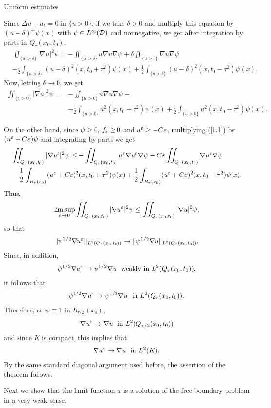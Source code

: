 \begin{section}{Uniform estimates}
\begin{pf}
Since $\Delta u - u_t = 0$ in $\{ u>0 \}$, if we take $\delta>0$ and multiply 
this equation by $(u-\delta)^+ \psi(x)$ with $\psi\in L^{\infty}({\cal D})$ 
and nonnegative, we get after integration by parts in $Q_{\tau}(x_0,t_0)$, 
\begin{align*}
&\iint_{\{ u>\delta\}}|\nabla u|^2 \psi =
-\iint_{\{ u>\delta\}}u\nabla u\nabla \psi +
\delta\iint_{\{ u>\delta\}}\nabla u\nabla\psi \\
&- \frac12 \int_{\{ u>\delta\}} (u-\delta)^2(x,t_0+\tau^2)\psi(x)
+ \frac12 \int_{\{ u>\delta\}} (u-\delta)^2(x,t_0-\tau^2)\psi(x).
\end{align*}
Now, letting $\delta\to 0$, we get
\begin{align*}
\iint_{\{ u>0\}}|\nabla u|^2\psi=&
-\iint_{\{ u>0\}} u\nabla u\nabla\psi -\\
&-\frac12\int_{\{ u>0\}} u^2(x,t_0+\tau^2)\psi(x)
+ \frac12\int_{\{ u>0\}} u^2(x,t_0-\tau^2)\psi(x).
\end{align*}

On the other hand, since $\psi\ge0$, $f_{\varepsilon}\ge0$ and $u^{\varepsilon}\ge-C\varepsilon$, 
multiplying (\ref{1.1}) by $(u^{\varepsilon}+C\varepsilon)\psi$ and integrating by parts 
we get
\begin{align*}
&\iint_{Q_{\tau}(x_0,t_0)}|\nabla u^{\varepsilon}|^2\psi\le
-\iint_{Q_{\tau}(x_0,t_0)} u^{\varepsilon}\nabla u^{\varepsilon}\nabla\psi -
C\varepsilon\iint_{Q_{\tau}(x_0,t_0)} \nabla u^{\varepsilon}\nabla\psi \\
&- \frac12\int_{B_{\tau}(x_0)} (u^{\varepsilon}+C\varepsilon)^2(x,t_0+\tau^2)\psi(x) +
\frac12\int_{B_{\tau}(x_0)} (u^{\varepsilon}+C\varepsilon)^2(x,t_0-\tau^2)\psi(x).
\end{align*}
Thus, 
$$\limsup_{\varepsilon\to0}\iint_{Q_{\tau}(x_0,t_0)}|\nabla u^{\varepsilon}|^2\psi\le
\iint_{Q_{\tau}(x_0,t_0)}|\nabla u|^2\psi,$$
so that
$$\|\psi^{1/2}\nabla u^{\varepsilon}\|_{L^2(Q_{\tau}(x_0,t_0))}\to
\|\psi^{1/2}\nabla u\|_{L^2(Q_{\tau}(x_0,t_0))}.$$
Since, in addition, 
$$\psi^{1/2}\nabla u^{\varepsilon}\to\psi^{1/2}\nabla u
\ \mbox{ weakly in } L^2(Q_{\tau}(x_0,t_0)),$$
it follows that
$$\psi^{1/2}\nabla u^{\varepsilon}\to\psi^{1/2}\nabla u
\ \mbox{ in } L^2(Q_{\tau}(x_0,t_0)).$$
Therefore, as $\psi\equiv 1$ in $B_{\tau/2}(x_0)$, 
$$\nabla u^{\varepsilon}\to\nabla u\ \mbox{ in } L^2(Q_{\tau/2}(x_0,t_0))$$
and since $K$ is compact, this implies that
$$\nabla u^{\varepsilon}\to\nabla u\ \mbox{ in } L^2(K).$$
By the same standard diagonal argument used before, the assertion of the 
theorem follows. 
\end{pf}



Next we show that the limit function $u$ is a solution of the free
boundary problem in a very 
weak sense.



\end{section}
